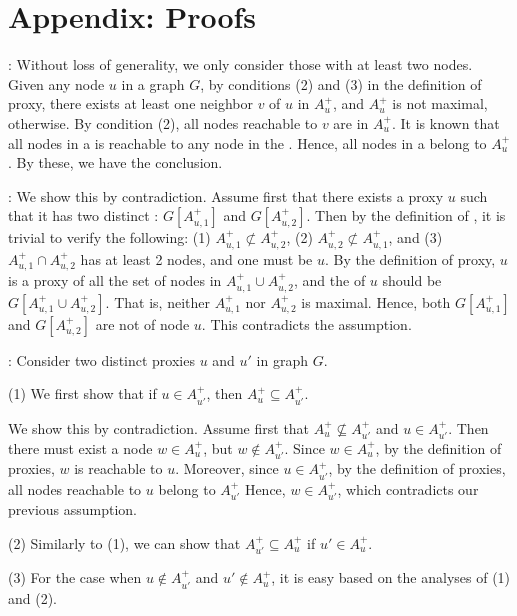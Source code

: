 \section*{Appendix: Proofs}
\label{sec-proofs}
:
Without loss of generality, we only consider those \ccs with at least two nodes.
Given any node $u$ in a graph $G$, by conditions (2) and (3) in the definition of proxy, there exists at least one neighbor $v$ of $u$ in $A^+_u$, and $A^+_u$ is not maximal, otherwise. By condition (2), all nodes reachable to $v$ are in $A^+_u$. It is known that all nodes in a \cc is reachable to any node in the \cc.
Hence, all nodes in a \cc belong to $A^+_u$. By these, we have the conclusion.
\eop


:
We show this by contradiction. Assume first that there exists a proxy $u$ such that it has two distinct \dras: $G[A^+_{u,1}]$ and $G[A^+_{u,2}]$.
Then by the definition of \dra, it is trivial to verify the following:
%
(1) $A^+_{u,1}\not\subset A^+_{u,2}$,
(2) $A^+_{u,2}\not\subset A^+_{u,1}$, and
(3) $A^+_{u,1}\cap A^+_{u,2}$ has at least 2 nodes, and one must be $u$.
%
By the definition of proxy, $u$ is a proxy of all the set of nodes in $A^+_{u,1}\cup A^+_{u,2}$, and the \dra of $u$ should be $G[A^+_{u,1}\cup A^+_{u,2}]$. That is, neither $A^+_{u,1}$ nor $A^+_{u,2}$ is maximal. Hence, both $G[A^+_{u,1}]$ and $G[A^+_{u,2}]$ are not \dras of node $u$.
This contradicts the assumption.
\eop


:
Consider two distinct proxies $u$ and $u'$ in graph $G$.


\noindent(1) We first show that if $u\in A^+_{u'}$, then $A^+_{u}\subseteq A^+_{u'}$.

We show this by contradiction. Assume first that $A^+_{u}\not\subseteq A^+_{u'}$ and $u\in A^+_{u'}$.
Then there must exist a node $w\in A^+_{u}$, but $w\not\in A^+_{u'}$.
%
Since $w\in A^+_{u}$, by the definition of proxies, $w$ is reachable to $u$.
Moreover, since $u\in A^+_{u'}$, by the definition of proxies, all nodes reachable to $u$ belong to  $A^+_{u'}$
Hence, $w\in A^+_{u'}$, which contradicts our previous assumption.

\noindent(2) Similarly to (1), we can show that $A^+_{u'}\subseteq A^+_{u}$  if $u'\in A^+_{u}$.

\noindent(3) For the case when $u\not\in A^+_{u'}$ and $u'\not\in A^+_{u}$, it is easy based on the analyses of (1) and (2).
\eop

